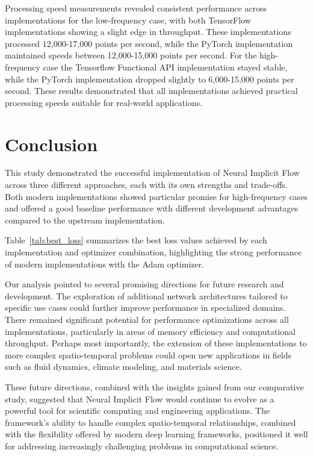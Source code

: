 \documentclass[10pt,journal,compsoc,onecolumn]{IEEEtran}
\begin{document}
Processing speed measurements revealed consistent performance across implementations for the low-frequency case, with both TensorFlow implementations showing a slight edge in throughput. These implementations processed 12,000-17,000 points per second, while the PyTorch implementation maintained speeds between 12,000-15,000 points per second. For the high-frequency case the Tensorflow Functional API implementation stayed stable, while the PyTorch implementation dropped slightly to 6,000-15,000 points per second. These results demonstrated that all implementations achieved practical processing speeds suitable for real-world applications.

\section{Conclusion}\label{sec:conclusion}
This study demonstrated the successful implementation of Neural Implicit Flow across three different approaches, each with its own strengths and trade-offs. Both modern implementations showed particular promise for high-frequency cases and offered a good baseline performance with different development advantages compared to the upstream implementation.

Table~\ref{tab:best_loss} summarizes the best loss values achieved by each implementation and optimizer combination, highlighting the strong performance of modern implementations with the Adam optimizer.

Our analysis pointed to several promising directions for future research and development. The exploration of additional network architectures tailored to specific use cases could further improve performance in specialized domains. There remained significant potential for performance optimizations across all implementations, particularly in areas of memory efficiency and computational throughput. Perhaps most importantly, the extension of these implementations to more complex spatio-temporal problems could open new applications in fields such as fluid dynamics, climate modeling, and materials science.

These future directions, combined with the insights gained from our comparative study, suggested that Neural Implicit Flow would continue to evolve as a powerful tool for scientific computing and engineering applications. The framework's ability to handle complex spatio-temporal relationships, combined with the flexibility offered by modern deep learning frameworks, positioned it well for addressing increasingly challenging problems in computational science.



\end{document}
